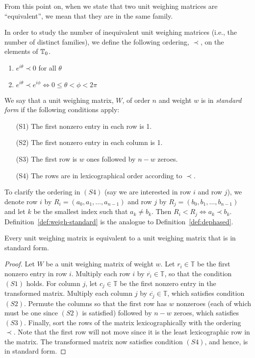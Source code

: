 From this point on, when we state that two unit weighing matrices are ``equivalent'', we mean that they are in the same family.

In order to study the number of inequivalent unit weighing matrices (i.e., the number of distinct families), we define the following ordering, $\prec$, on the elements of $\mathbb{T}_0$.

  \begin{enumerate}
   \item $e^{i\theta} \prec 0$ for all $\theta$
   \item $e^{i\theta} \prec e^{i\phi} \iff 0 \leq \theta < \phi < 2\pi$
  \end{enumerate}

\begin{definition} \label{def:weigh-standard}
 We say that a unit weighing matrix, $W$, of order $n$ and weight $w$ is in {\it standard form} if the following conditions apply:

 \begin{enumerate}
  \item[(S1)] The first nonzero entry in each row is 1.
  \item[(S2)] The first nonzero entry in each column is 1.
  \item[(S3)] The first row is $w$ ones followed by $n-w$ zeroes.
  \item[(S4)] The rows are in lexicographical order according to $\prec$.
 \end{enumerate}
\end{definition}

To clarify the ordering in $(S4)$ (say we are interested in row $i$ and row $j$), we denote row $i$ by $R_i=\left(a_0,a_1,\dots,a_{n-1}\right)$ and row $j$ by $R_j=\left(b_0,b_1,\dots,b_{n-1}\right)$ and let $k$ be the smallest index such that $a_k \neq b_k$. Then $R_i < R_j \iff a_k \prec b_k$. Definition~\ref{def:weigh-standard} is the analogue to Definition~\ref{def:dephased}.

\begin{theorem} \label{th:weigh-standard}
 Every unit weighing matrix is equivalent to a unit weighing matrix that is in standard form.
\begin{proof}
 Let $W$ be a unit weighing matrix of weight $w$. Let $r_i \in \mathbb{T}$ be the first nonzero entry in row $i$. Multiply each row $i$ by $\overline{r_i} \in \mathbb{T}$, so that the condition $(S1)$ holds. For column $j$, let $c_j \in \mathbb{T}$ be the first nonzero entry  in the transformed matrix. Multiply each column $j$ by $\overline{c_j} \in \mathbb{T}$, which satisfies condition $(S2)$. Permute the columns so that the first row has $w$ nonzeroes (each of which must be one since $(S2)$ is satisfied) followed by $n-w$ zeroes, which satisfies $(S3)$. Finally, sort the rows of the matrix lexicographically with the ordering $\prec$. Note that the first row will not move since it is the least lexicographic row in the matrix. The transformed matrix now satisfies condition $(S4)$, and hence, is in standard form.
\end{proof}
\end{theorem}

